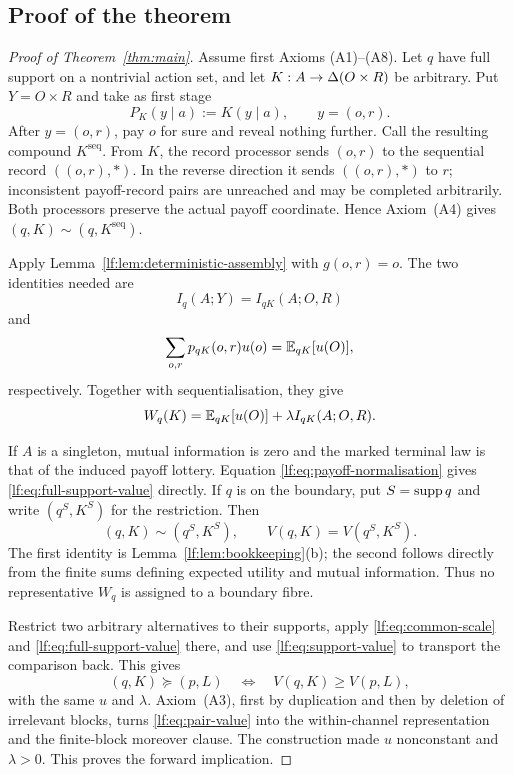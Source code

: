 \subsection{Proof of the theorem}

\begin{proof}[Proof of Theorem~\ref{thm:main}]
Assume first Axioms \textup{(A1)--(A8)}.  Let $q$ have full support on a
nontrivial action set, and let $K:A\to\Delta(O\times R)$ be arbitrary.  Put
$Y=O\times R$ and take as first stage
\[
P_K(y\mid a):=K(y\mid a),
\qquad y=(o,r).
\]
After $y=(o,r)$, pay $o$ for sure and reveal nothing further.  Call the
resulting compound $K^{\mathrm{seq}}$.  From $K$, the record processor sends
$(o,r)$ to the sequential record $((o,r),\ast)$.  In the reverse direction it
sends $((o,r),\ast)$ to $r$; inconsistent payoff-record pairs are unreached and
may be completed arbitrarily.  Both processors preserve the actual payoff
coordinate.  Hence Axiom~\textup{(A4)} gives
$(q,K)\sim(q,K^{\mathrm{seq}})$.

\begin{samepage}
Apply Lemma~\ref{lf:lem:deterministic-assembly} with $g(o,r)=o$.  The two
identities needed are
\[
I_q(A;Y)=I_{qK}(A;O,R)
\]
and
\[
\sum_{o,r}p_{qK}(o,r)u(o)=\mathbb E_{qK}[u(O)],
\]
respectively.  Together with sequentialisation, they give
\begin{equation}
W_q(K)=\mathbb E_{qK}[u(O)]+\lambda I_{qK}(A;O,R).
\label{lf:eq:full-support-value}
\end{equation}
\end{samepage}

If $A$ is a singleton, mutual information is zero and the marked terminal law
is that of the induced payoff lottery.  Equation
\eqref{lf:eq:payoff-normalisation} gives
\eqref{lf:eq:full-support-value} directly.  If $q$ is on the boundary, put
$S=\operatorname{supp} q$ and write $(q^S,K^S)$ for the restriction.  Then
\begin{equation}
(q,K)\sim(q^S,K^S),
\qquad
V(q,K)=V(q^S,K^S).
\label{lf:eq:support-value}
\end{equation}
The first identity is Lemma~\ref{lf:lem:bookkeeping}\textup{(b)}; the second
follows directly from the finite sums defining expected utility and mutual
information.  Thus no representative $W_q$ is assigned to a boundary fibre.

Restrict two arbitrary alternatives to their supports, apply
\eqref{lf:eq:common-scale} and \eqref{lf:eq:full-support-value} there, and use
\eqref{lf:eq:support-value} to transport the comparison back.  This gives
\begin{equation}
(q,K)\succeq(p,L)
\quad\Longleftrightarrow\quad
V(q,K)\ge V(p,L),
\label{lf:eq:pair-value}
\end{equation}
with the same $u$ and $\lambda$.  Axiom~\textup{(A3)}, first by duplication and
then by deletion of irrelevant blocks, turns \eqref{lf:eq:pair-value} into the
within-channel representation and the finite-block moreover clause.  The
construction made $u$ nonconstant and $\lambda>0$.  This proves the forward
implication.


\end{proof}
